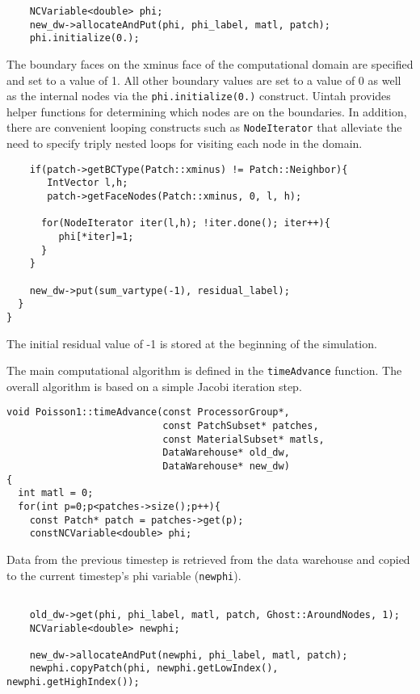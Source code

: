 \documentclass[12pt]{report}
\begin{document}
\begin{verbatim}
    NCVariable<double> phi;
    new_dw->allocateAndPut(phi, phi_label, matl, patch);
    phi.initialize(0.);
\end{verbatim}

The boundary faces on the xminus face of the computational domain are
specified and set to a value of 1.  All other boundary values are set
to a value of 0 as well as the internal nodes via the
\texttt{phi.initialize(0.)} construct.  Uintah provides helper
functions for determining which nodes are on the boundaries.  In
addition, there are convenient looping constructs such as
\texttt{NodeIterator} that alleviate the need to specify triply nested
loops for visiting each node in the domain.

\begin{verbatim}
    if(patch->getBCType(Patch::xminus) != Patch::Neighbor){
       IntVector l,h;
       patch->getFaceNodes(Patch::xminus, 0, l, h);

      for(NodeIterator iter(l,h); !iter.done(); iter++){
         phi[*iter]=1;
      }
    }

    new_dw->put(sum_vartype(-1), residual_label);
  }
}

\end{verbatim}

The initial residual value of -1 is stored at the beginning of the
simulation.

The main computational algorithm is defined in the
\texttt{timeAdvance} function.  The overall algorithm is based on a
simple Jacobi iteration step.

\begin{verbatim}
void Poisson1::timeAdvance(const ProcessorGroup*,
                           const PatchSubset* patches,
                           const MaterialSubset* matls,
                           DataWarehouse* old_dw,
                           DataWarehouse* new_dw)
{
  int matl = 0;
  for(int p=0;p<patches->size();p++){
    const Patch* patch = patches->get(p);
    constNCVariable<double> phi;

\end{verbatim}

Data from the previous timestep is retrieved from the data warehouse
and copied to the current timestep's phi variable (\texttt{newphi}).

\begin{verbatim}

    old_dw->get(phi, phi_label, matl, patch, Ghost::AroundNodes, 1);
    NCVariable<double> newphi;

    new_dw->allocateAndPut(newphi, phi_label, matl, patch);
    newphi.copyPatch(phi, newphi.getLowIndex(), newphi.getHighIndex());

\end{verbatim}
\end{document}
